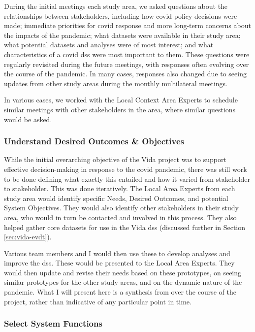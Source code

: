 During the initial meetings each study area, we asked questions about the relationships between stakeholders, including how \ac{covid} policy decisions were made; immediate priorities for \ac{covid} response and more long-term concerns about the impacts of the pandemic; what datasets were available in their study area; what potential datasets and analyses were of most interest; and what characteristics of a \ac{covid} \ac{dss} were most important to them. These questions were regularly revisited during the future meetings, with responses often evolving over the course of the pandemic. In many cases, responses also changed due to seeing updates from other study areas during the monthly multilateral meetings.

In various cases, we worked with the Local Context Area Experts to schedule similar meetings with other stakeholders in the area, where similar questions would be asked.


\subsubsection{Understand Desired Outcomes \& Objectives}

While the initial overarching objective of the Vida project was to support effective decision-making in response to the \ac{covid} pandemic, there was still work to be done defining what exactly this entailed and how it varied from stakeholder to stakeholder. This was done iteratively. The Local Area Experts from each study area would identify specific Needs, Desired Outcomes, and potential System Objectives. They would also identify other stakeholders in their study area, who would in turn be contacted and involved in this process. They also helped gather core datasets for use in the Vida \ac{dss} (discussed further in Section \ref{sec:vida-evdt}). 

Various team members and I would then use these to develop analyses and improve the \ac{dss}. These would be presented to the Local Area Experts. They would then update and revise their needs based on these prototypes, on seeing similar prototypes for the other study areas, and on the dynamic nature of the pandemic. What I will present here is a synthesis from over the course of the project, rather than indicative of any particular point in time.

\subsubsection{Select System Functions}

